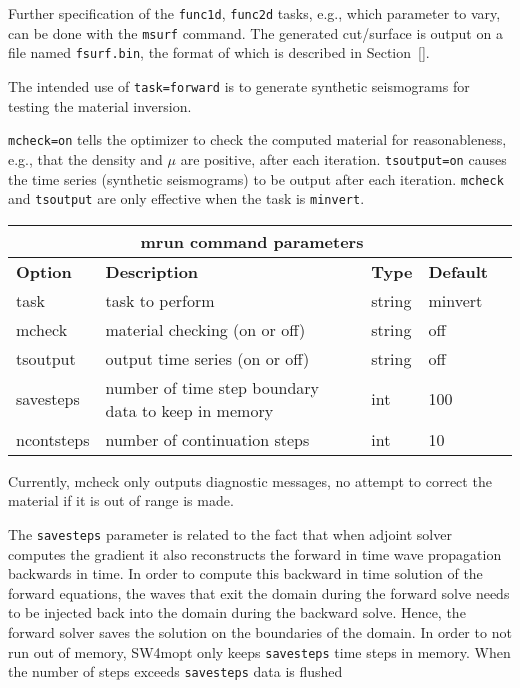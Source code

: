 \documentclass[12pt]{report}
\begin{document}
Further specification of the {\tt func1d}, {\tt func2d} tasks, e.g., which parameter to
vary, can be done with the \verb+msurf+ command. The generated cut/surface is output on
a file named {\tt fsurf.bin}, the format of which is described in Section~\ref{}.
\par
The intended use of \verb+task=forward+ is to
generate synthetic seismograms for testing the material inversion. \par
\verb+mcheck=on+ tells the optimizer to check the computed material for reasonableness, e.g.,
that the density and $\mu$ are positive, after each iteration. \verb+tsoutput=on+ causes
the time series (synthetic seismograms) to be output after each iteration.
\verb+mcheck+ and \verb+tsoutput+ are only effective when the task is \verb+minvert+.
\begin{center}
\begin{tabular}{|l|p{6cm}|l|l|l|} \hline
\multicolumn{4}{|c|}{\bf mrun command parameters}\\ \hline
{\bf Option} & {\bf Description}          & {\bf Type} & {\bf Default} \\ \hline 
\hline
task    & task to perform                 & string & minvert \\ \hline
mcheck  & material checking (on or off)   & string & off \\ \hline
tsoutput & output time series (on or off) & string & off \\ \hline
savesteps& number of time step boundary data to keep in memory&int & 100  \\ \hline
ncontsteps& number of continuation steps & int & 10 \\ \hline
\end{tabular}
\end{center}
Currently, mcheck only outputs diagnostic messages, no attempt to correct the material if
it is out of range is made.
\par
The {\tt savesteps} parameter is related to the fact that when adjoint solver computes
the gradient it also reconstructs the forward in time wave propagation backwards in time.
In order to compute this backward in time solution of the forward equations, the waves that
exit the domain during the forward solve needs to be injected back into the domain
during the backward solve. Hence, the forward solver saves the solution on the boundaries
of the domain. In order to not run out of memory, SW4mopt only keeps {\tt savesteps} time
steps in memory. When the number of steps exceeds {\tt savesteps} data is flushed
\end{document}
